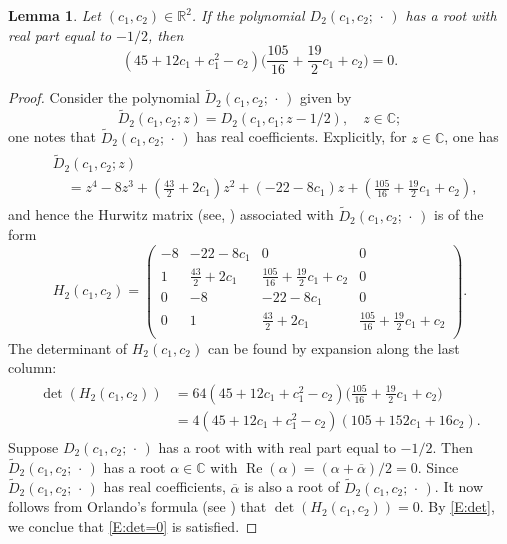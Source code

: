 \documentclass[reqno,11pt,centertags]{amsart}
\newcommand{\bbR}{{\mathbb{R}}}
\newcommand{\bbC}{{\mathbb{C}}}
\newcommand{\<}{\langle}
\renewcommand{\>}{\rangle}
\newcommand{\lb}{\label}
\newcommand{\dott}{\,\cdot\,}
\renewcommand{\Re}{\operatorname{Re}}
\numberwithin{equation}{section}
\newtheorem{lemma}[theorem]{Lemma}
\theoremstyle{definition}
\begin{document}
\begin{lemma}\lb{l2.1}
Let $(c_1,c_2)\in \bbR^2$. If the polynomial $D_2(c_1,c_2;\dott)$ has a root with real part equal to $-1/2$, then
\begin{equation}\lb{E:det=0}
(45 + 12 c_1 + c_1^2 - c_2) \bigg(\frac{105}{16} + \frac{19}{2} c_1 + c_2\bigg)=0.
\end{equation}
\end{lemma}
\begin{proof} Consider the  polynomial $\widetilde{D}_2(c_1,c_2;\dott)$ given by 
\begin{equation}
\widetilde{D}_2(c_1,c_2; z)= D_2(c_1,c_1; z-1/2), \quad z\in \bbC;
\end{equation}
one notes that $\widetilde{D}_2(c_1,c_2;\dott)$ has real coefficients. Explicitly, for $z\in \bbC$, one has
\begin{align}
\begin{split} 
&\widetilde{D}_2(c_1,c_2; z)\\
&\quad =z^4 - 8z^3+ \left(  \frac{43}{2} +2 c_1\right)z^2 +\left(-22-8 c_1\right)z+ \left(\frac{105}{16}+\frac{19}{2}c_1+c_2\right),  
\end{split} 
\end{align}
and hence the  Hurwitz matrix (see, \cite[\S~XV.6]{Ga59}) associated  with $\widetilde{D}_2(c_1,c_2;\dott)$ is of the form 
\begin{equation}
H_2(c_1,c_2)=
\left(
\begin{array}{cccc}
 -8 & -22 -8 c_1 & 0 & 0 \\[5pt]
 1 & \frac{43}{2} +2 c_1 & \frac{105}{16} +\frac{19}{2}c_1+c_2& 0 \\[5pt]
 0 & -8 & -22-8 c_1 & 0 \\[3pt]
 0 & 1 & \frac{43}{2} +2 c_1& \frac{105}{16}+\frac{19}{2}c_1+c_2 \\[5pt]
\end{array}
\right).
\end{equation}
The determinant of $H_2(c_1,c_2)$ can be found by expansion along the last column:
\begin{align} 
\begin{split} 
\det (H_2(c_1,c_2)) &= 64(45 + 12 c_1 + c_1^2 - c_2) \bigg(\frac{105}{16} + \frac{19}{2} c_1 + c_2\bigg)    \\
& = 4 (45 + 12 c_1 + c_1^2 - c_2) (105 + 152 c_1 + 16 c_2).      \lb{E:det}
\end{split} 
\end{align}
Suppose $D_2(c_1,c_2;\dott)$ has a root with with real part equal to $-1/2$. Then 
$\widetilde{D}_2(c_1,c_2;\dott)$ has a root $\alpha\in \bbC$  with $\Re(\alpha)=(\alpha+\overline{\alpha})/2=0$.
Since $\widetilde{D}_2(c_1,c_2;\dott)$ has real coefficients,
$\overline{\alpha}$ is also a root of $\widetilde{D}_2(c_1,c_2;\dott)$. It now follows from Orlando's formula (see \cite[\S~XV.7]{Ga59}) that $\det (H_2(c_1,c_2)) = 0$. 
By \eqref{E:det}, we conclue that \eqref{E:det=0} is satisfied.
\end{proof}
\end{document}
